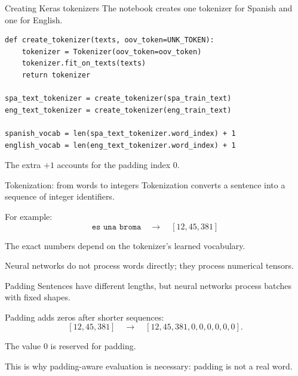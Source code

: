 \documentclass[aspectratio=169]{beamer}
\begin{document}
%
%
\begin{frame}[fragile]{Creating Keras tokenizers}
The notebook creates one tokenizer for Spanish and one for English.

\begin{lstlisting}
def create_tokenizer(texts, oov_token=UNK_TOKEN):
    tokenizer = Tokenizer(oov_token=oov_token)
    tokenizer.fit_on_texts(texts)
    return tokenizer

spa_text_tokenizer = create_tokenizer(spa_train_text)
eng_text_tokenizer = create_tokenizer(eng_train_text)

spanish_vocab = len(spa_text_tokenizer.word_index) + 1
english_vocab = len(eng_text_tokenizer.word_index) + 1
\end{lstlisting}

The extra $+1$ accounts for the padding index $0$.
\end{frame}
%
%
\begin{frame}[fragile]{Tokenization: from words to integers}
Tokenization converts a sentence into a sequence of integer identifiers.

\vspace{0.3cm}
For example:
\[
    \texttt{es una broma}
    \quad \longrightarrow \quad
    [12, 45, 381]
\]

\vspace{0.3cm}
The exact numbers depend on the tokenizer's learned vocabulary.

\vspace{0.3cm}
Neural networks do not process words directly; they process numerical tensors.
\end{frame}
%
%
\begin{frame}[fragile]{Padding}
Sentences have different lengths, but neural networks process batches with fixed shapes.

\vspace{0.3cm}
Padding adds zeros after shorter sequences:
\[
    [12,45,381]
    \quad \longrightarrow \quad
    [12,45,381,0,0,0,0,0,0].
\]

\vspace{0.3cm}
The value $0$ is reserved for padding.

\vspace{0.3cm}
This is why padding-aware evaluation is necessary: padding is not a real word.
\end{frame}
\end{document}
